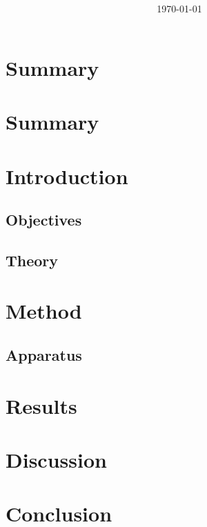 \documentclass{article}
\begin{document}
\title{\textbf{}}
\author{}
\date{\today}
\maketitle
{}
\section{Summary}
\newpage
{}
\section{Summary}
\tableofcontents
\section{Introduction}
\subsection{Objectives}
\subsection{Theory}
\section{Method}
\subsection{Apparatus}
\section{Results}
\section{Discussion}
\section{Conclusion}
\newpage
\printbibliography
\end{document}
